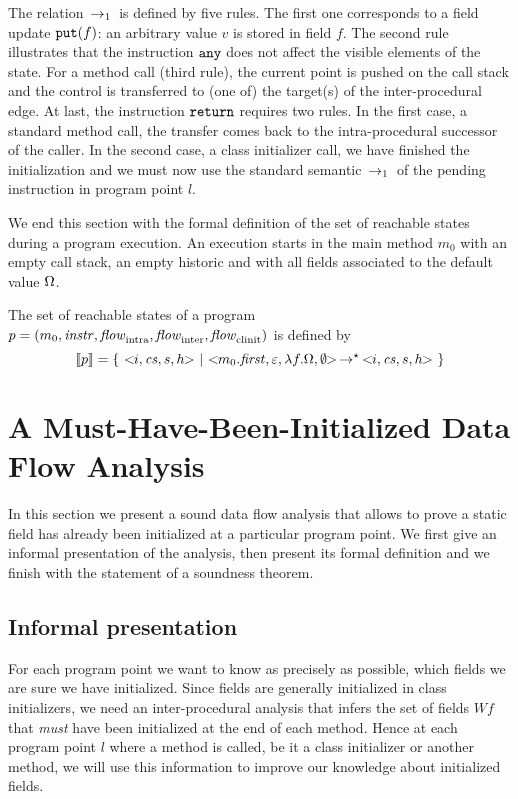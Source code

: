 \documentclass{entcs}
\newcommand{\wf}{\ensuremath{\mathit{Wf}}}
\newcommand{\flow}{\mathit{flow}}
\newcommand{\intraflow}{\flow_{\rm intra}}
\newcommand{\interflow}{\flow_{\rm inter}}
\newcommand{\clinitflow}{\flow_{\rm clinit}}
\begin{document}
The relation $\,\to_1\,$ is defined by five rules.
The first one corresponds to a field update $\mathtt{put}(f)$: an arbitrary
value $v$ is stored in field $f$.
The second rule illustrates that the instruction $\mathtt{any}$ does not affect
the visible elements of the state.
For a method call (third rule), the current point is pushed on the
call stack and the control is transferred to (one of) the target(s) of
the inter-procedural edge.
At last, the instruction $\mathtt{return}$ requires two rules.  In the first
case, a standard method call, the transfer comes back to the
intra-procedural successor of the caller.  In the second case, a class
initializer call, we have finished the initialization
and we must now use the standard semantic $\,\to_1\,$ of the pending
instruction in program point $l$.

We end this section with the formal definition of the set of reachable
states during a program execution.  An execution starts in the main
method $m_0$ with an empty call stack, an empty historic and with all
fields associated to the default value $\Omega$.

\begin{definition}
  The set of reachable states of a program
  $p=(m_0,\instrAt,\intraflow,\interflow,\clinitflow)$ is defined by
 $$\ia{p} = \left\{\ \st{i,\cs,s,\hist}\ \mid\ 
   \st{m_0.\first,\nil,\lambda f.\undef,\emptyset} \stepstar
   \st{i,\cs,s,\hist}\ \right\}$$
\end{definition}

\section{A Must-Have-Been-Initialized Data Flow Analysis}
\label{sec:analysis}

In this section we present a sound data flow analysis that allows to
prove a static field has already been initialized at a particular
program point.  We first give an informal presentation of the
analysis, then present its formal definition and we finish with the
statement of a soundness theorem.


\subsection{Informal presentation}
\label{sec:informal-presentation}
For each program point we want to know as precisely as possible, which
fields we are sure we have initialized.  Since fields are generally
initialized in class initializers, we need an inter-procedural
analysis that infers the set of fields $\wf$ that \emph{must} have
been initialized at the end of each method.  Hence at each program
point $l$ where a method is called, be it a class initializer or
another method, we will use this information to improve our knowledge
about initialized fields.
\end{document}
